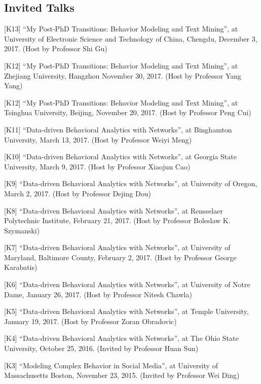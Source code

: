 \documentclass[margin, 9pt]{res}
\begin{document}
\begin{resume}

\section{Invited Talks}

[K13] ``My Post-PhD Transitions: Behavior Modeling and Text Mining'', at University of Electronic Science and Technology of China, Chengdu, December 3, 2017. (Host by Professor Shi Gu)

[K12] ``My Post-PhD Transitions: Behavior Modeling and Text Mining'', at Zhejiang University, Hangzhou November 30, 2017. (Host by Professor Yang Yang)

[K12] ``My Post-PhD Transitions: Behavior Modeling and Text Mining'', at Tsinghua University, Beijing, November 20, 2017. (Host by Professor Peng Cui)

[K11] ``Data-driven Behavioral Analytics with Networks'', at Binghamton University, March 13, 2017. (Host by Professor Weiyi Meng)

[K10] ``Data-driven Behavioral Analytics with Networks'', at Georgia State University, March 9, 2017. (Host by Professor Xiaojun Cao)

[K9] ``Data-driven Behavioral Analytics with Networks'', at University of Oregon, March 2, 2017. (Host by Professor Dejing Dou)

[K8] ``Data-driven Behavioral Analytics with Networks'', at Rensselaer Polytechnic Institute, February 21, 2017. (Host by Professor Boleslaw K. Szymanski)

[K7] ``Data-driven Behavioral Analytics with Networks'', at University of Maryland, Baltimore County, February 2, 2017. (Host by Professor George Karabatis)

[K6] ``Data-driven Behavioral Analytics with Networks'', at University of Notre Dame, January 26, 2017. (Host by Professor Nitesh Chawla)

[K5] ``Data-driven Behavioral Analytics with Networks'', at Temple University, January 19, 2017. (Host by Professor Zoran Obradovic)

[K4] ``Data-driven Behavioral Analytics with Networks'', at The Ohio State University, October 25, 2016. (Invited by Professor Huan Sun)

[K3] ``Modeling Complex Behavior in Social Media'', at University of Massachusetts Boston, November 23, 2015. (Invited by Professor Wei Ding)


\end{resume}
\end{document}
